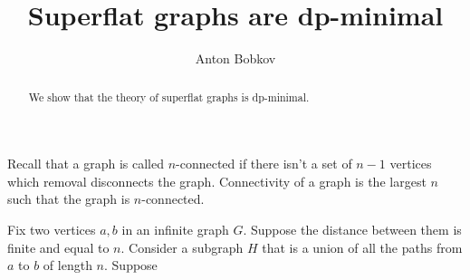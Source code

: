 \documentclass{amsart}
\begin{document}
\title{Superflat graphs are dp-minimal}
\author{Anton Bobkov}

\begin{abstract}
	We show that the theory of superflat graphs is dp-minimal.
\end{abstract}

\maketitle

Recall that a graph is called $n$-connected if there isn't a set of $n-1$ vertices which removal disconnects the graph. Connectivity of a graph is the largest $n$ such that the graph is $n$-connected.

\begin{Definition}
	Fix two vertices $a,b$ in an infinite graph $G$. Suppose the distance between them is finite and equal to $n$. Consider a subgraph $H$ that is a union of all the paths from $a$ to $b$ of length $n$. Suppose 
\end{Definition}
\end{document}
